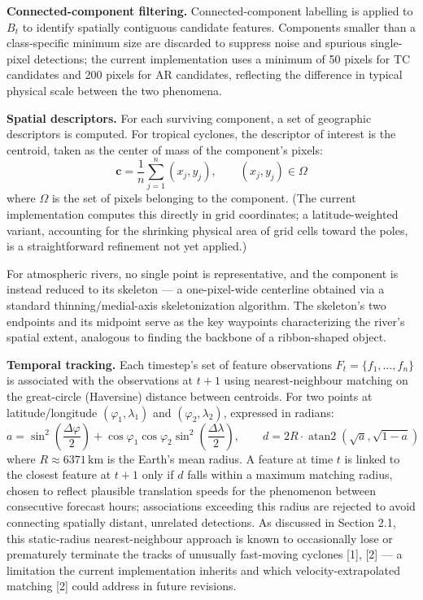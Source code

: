 \documentclass[journal abbreviation, manuscript]{copernicus}
\begin{document}
\textbf{Connected-component filtering.} Connected-component labelling is applied to $B_t$ to identify spatially contiguous candidate features. Components smaller than a class-specific minimum size are discarded to suppress noise and spurious single-pixel detections; the current implementation uses a minimum of 50 pixels for TC candidates and 200 pixels for AR candidates, reflecting the difference in typical physical scale between the two phenomena.

\textbf{Spatial descriptors.} For each surviving component, a set of geographic descriptors is computed. For tropical cyclones, the descriptor of interest is the centroid, taken as the center of mass of the component's pixels:
\begin{equation}
\mathbf{c} = \frac{1}{n}\sum_{j=1}^{n}(x_j,y_j),
\qquad
(x_j,y_j) \in \Omega
\tag{2}
\end{equation}
where $\Omega$ is the set of pixels belonging to the component. (The current implementation computes this directly in grid coordinates; a latitude-weighted variant, accounting for the shrinking physical area of grid cells toward the poles, is a straightforward refinement not yet applied.)

For atmospheric rivers, no single point is representative, and the component is instead reduced to its skeleton --- a one-pixel-wide centerline obtained via a standard thinning/medial-axis skeletonization algorithm. The skeleton's two endpoints and its midpoint serve as the key waypoints characterizing the river's spatial extent, analogous to finding the backbone of a ribbon-shaped object.

\textbf{Temporal tracking.} Each timestep's set of feature observations $F_t = \{f_1,\dots,f_n\}$ is associated with the observations at $t+1$ using nearest-neighbour matching on the great-circle (Haversine) distance between centroids. For two points at latitude/longitude $(\varphi_1,\lambda_1)$ and $(\varphi_2,\lambda_2)$, expressed in radians:
\begin{equation}
a =
\sin^2\!\left(\frac{\Delta\varphi}{2}\right)
+
\cos\varphi_1\cos\varphi_2
\sin^2\!\left(\frac{\Delta\lambda}{2}\right),
\qquad
d =
2R \cdot
\operatorname{atan2}\!\left(\sqrt{a},\sqrt{1-a}\right)
\tag{3}
\end{equation}
where $R \approx 6371\,\text{km}$ is the Earth's mean radius. A feature at time $t$ is linked to the closest feature at $t+1$ only if $d$ falls within a maximum matching radius, chosen to reflect plausible translation speeds for the phenomenon between consecutive forecast hours; associations exceeding this radius are rejected to avoid connecting spatially distant, unrelated detections. As discussed in Section 2.1, this static-radius nearest-neighbour approach is known to occasionally lose or prematurely terminate the tracks of unusually fast-moving cyclones [1], [2] --- a limitation the current implementation inherits and which velocity-extrapolated matching [2] could address in future revisions.
\end{document}
